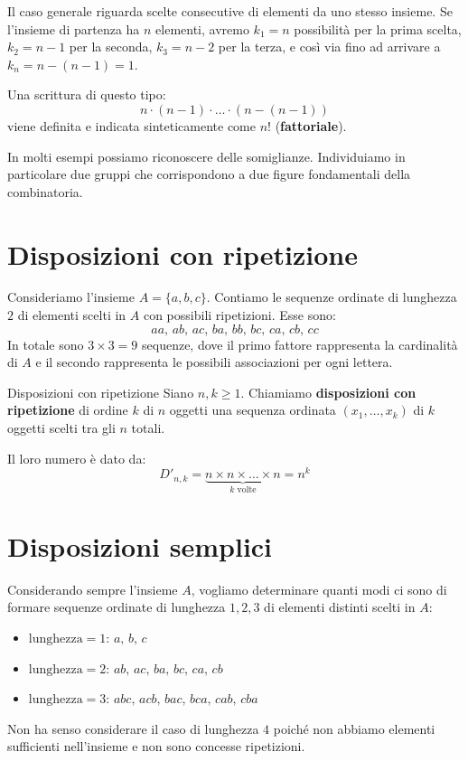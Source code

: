\documentclass[12pt]{report}
\begin{document}
	Il caso generale riguarda scelte consecutive di elementi da uno stesso insieme. Se l'insieme di partenza ha $n$ elementi, avremo $k_1 = n$ possibilità per la prima scelta, $k_2 = n-1$ per la seconda, $k_3 = n-2$ per la terza, e così via fino ad arrivare a $k_n = n - (n-1) = 1$.
	
	Una scrittura di questo tipo:
	\[
	n \cdot (n-1) \cdot \dots \cdot (n - (n-1))
	\]
	viene definita e indicata sinteticamente come $n!$ (\textbf{fattoriale}).
	
	In molti esempi possiamo riconoscere delle somiglianze. Individuiamo in particolare due gruppi che corrispondono a due figure fondamentali della combinatoria.
	
	\section{Disposizioni con ripetizione}
	
	Consideriamo l'insieme $A = \{a, b, c\}$. Contiamo le sequenze ordinate di lunghezza $2$ di elementi scelti in $A$ con possibili ripetizioni. Esse sono:
	\[
	aa, \, ab, \, ac, \, ba, \, bb, \, bc, \, ca, \, cb, \, cc
	\]
	In totale sono $3 \times 3 = 9$ sequenze, dove il primo fattore rappresenta la cardinalità di $A$ e il secondo rappresenta le possibili associazioni per ogni lettera.
	
	\begin{definizione}{Disposizioni con ripetizione}{}
		Siano $n, k \ge 1$. Chiamiamo \textbf{disposizioni con ripetizione} di ordine $k$ di $n$ oggetti una sequenza ordinata $(x_1, \dots, x_k)$ di $k$ oggetti scelti tra gli $n$ totali.
		
		Il loro numero è dato da:
		\[
		D'_{n,k} = \underbrace{n \times n \times \dots \times n}_{k \text{ volte}} = n^k
		\]
	\end{definizione}
	
	\section{Disposizioni semplici}
	
	Considerando sempre l'insieme $A$, vogliamo determinare quanti modi ci sono di formare sequenze ordinate di lunghezza $1, 2, 3$ di elementi distinti scelti in $A$:
	\begin{itemize}
		\item $\text{lunghezza} = 1$: $a, \, b, \, c$
		\item $\text{lunghezza} = 2$: $ab, \, ac, \, ba, \, bc, \, ca, \, cb$
		\item $\text{lunghezza} = 3$: $abc, \, acb, \, bac, \, bca, \, cab, \, cba$
	\end{itemize}
	Non ha senso considerare il caso di lunghezza $4$ poiché non abbiamo elementi sufficienti nell'insieme e non sono concesse ripetizioni.
	
\end{document}
